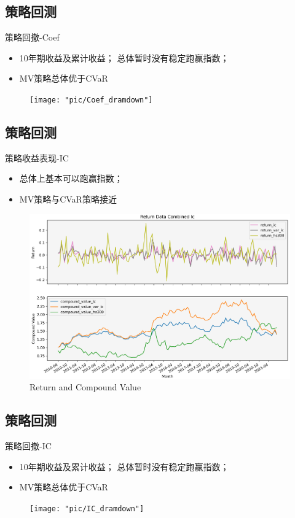 \documentclass[CJK,aspectratio=43]{beamer}  %
\begin{document}
\subsection{策略回测}
\begin{frame}{策略回撤-Coef}
	\begin{itemize}
		\item 10年期收益及累计收益； 总体暂时没有稳定跑赢指数； 
		\item MV策略总体优于CVaR
	\end{itemize}
	\begin{figure}
		\centering
		\texttt{[image: "pic/Coef\_dramdown"]}
		\caption{}
		\label{fig:coefdramdown}
	\end{figure}
\end{frame}

\subsection{策略回测}
\begin{frame}{策略收益表现-IC}
	\begin{itemize}
		\item 总体上基本可以跑赢指数； 
		\item MV策略与CVaR策略接近
	\end{itemize}
	\begin{figure}
		\centering
		\includegraphics[width=0.8\linewidth]{pic/IC}
		\caption{Return and Compound Value}
		\label{fig:ic}
	\end{figure}
\end{frame}

\subsection{策略回测}
\begin{frame}{策略回撤-IC}
	\begin{itemize}
		\item 10年期收益及累计收益； 总体暂时没有稳定跑赢指数； 
		\item MV策略总体优于CVaR
	\end{itemize}
	\begin{figure}
		\centering
		\texttt{[image: "pic/IC\_dramdown"]}
		\caption{}
		\label{fig:icdramdown}
	\end{figure}
\end{frame}
\end{document}

